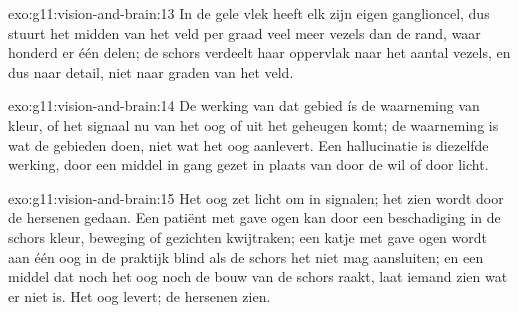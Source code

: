 \begin{solution}{exo:g11:vision-and-brain:13}
In de gele vlek heeft elk  zijn eigen ganglioncel, dus stuurt het
midden van het veld per graad veel meer vezels dan de rand, waar honderd
 er één delen; de schors verdeelt haar oppervlak naar het aantal
vezels, en dus naar detail, niet naar graden van het veld.
\end{solution}

\begin{solution}{exo:g11:vision-and-brain:14}
De werking van dat gebied ís de waarneming van kleur, of het signaal nu
van het oog of uit het geheugen komt; de waarneming is wat de gebieden
doen, niet wat het oog aanlevert. Een hallucinatie is diezelfde werking,
door een middel in gang gezet in plaats van door de wil of door licht.
\end{solution}

\begin{solution}{exo:g11:vision-and-brain:15}
Het oog zet licht om in signalen; het zien wordt door de hersenen gedaan.
Een patiënt met gave ogen kan door een beschadiging in de schors kleur,
beweging of gezichten kwijtraken; een katje met gave ogen wordt aan één
oog in de praktijk blind als de schors het niet mag aansluiten; en een
middel dat noch het oog noch de bouw van de schors raakt, laat iemand zien
wat er niet is. Het oog levert; de hersenen zien.
\end{solution}

